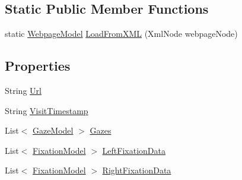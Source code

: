 \subsection*{Static Public Member Functions}
\begin{DoxyCompactItemize}
\item 
static \hyperlink{class_web_analyzer_1_1_models_1_1_data_model_1_1_webpage_model}{Webpage\+Model} \hyperlink{class_web_analyzer_1_1_models_1_1_data_model_1_1_webpage_model_a26999baeddbe48b5c6f10a0b7510c807}{Load\+From\+X\+M\+L} (Xml\+Node webpage\+Node)
\end{DoxyCompactItemize}
\subsection*{Properties}
\begin{DoxyCompactItemize}
\item 
String \hyperlink{class_web_analyzer_1_1_models_1_1_data_model_1_1_webpage_model_a956b067ed12f422f646b7e2a4b6bb42d}{Url}
\item 
String \hyperlink{class_web_analyzer_1_1_models_1_1_data_model_1_1_webpage_model_ac3378fdc78273706547ec3a9d377ef9a}{Visit\+Timestamp}
\item 
List$<$ \hyperlink{class_web_analyzer_1_1_models_1_1_data_model_1_1_gaze_model}{Gaze\+Model} $>$ \hyperlink{class_web_analyzer_1_1_models_1_1_data_model_1_1_webpage_model_acb4a6ecac0e4ef9ed2df7b33e4694b31}{Gazes}
\item 
List$<$ \hyperlink{class_web_analyzer_1_1_models_1_1_analysis_model_1_1_fixation_model}{Fixation\+Model} $>$ \hyperlink{class_web_analyzer_1_1_models_1_1_data_model_1_1_webpage_model_af4888add7ed76fe7b841410abc944b99}{Left\+Fixation\+Data}
\item 
List$<$ \hyperlink{class_web_analyzer_1_1_models_1_1_analysis_model_1_1_fixation_model}{Fixation\+Model} $>$ \hyperlink{class_web_analyzer_1_1_models_1_1_data_model_1_1_webpage_model_abe8cc7ad2f30655dbd1ba0c1111429d6}{Right\+Fixation\+Data}
\end{DoxyCompactItemize}
